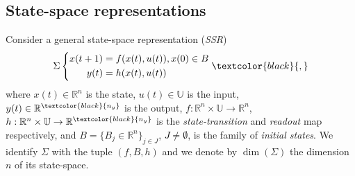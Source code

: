 \documentclass[journal,twoside,web]{ieeecolor}
\begin{document}
\subsection{State-space representations}
   Consider a general state-space representation (\emph{SSR})
\begin{equation}
\label{gen:eq1}
\Sigma \left \{\begin{split}
 x(t+1)&=f(x(t),u(t)), x(0) \in B \\
 y(t)& =h(x(t),u(t))
\end{split}\right. \textcolor{black}{,}
\end{equation}
where $x(t) \in \mathbb{R}^n$ is the state, $u(t) \in \mathbb{U}$ is the input, $y(t) \in \mathbb{R}^{\textcolor{black}{n_y}}$ is the output,
$f:\mathbb{R}^n \times \mathbb{U} \rightarrow \mathbb{R}^n$, 
$h:\mathbb{R}^n  \times \mathbb{U} \rightarrow \mathbb{R}^{\textcolor{black}{n_y}}$ is the \emph{state-transition} and
\emph{readout} map respectively, and  
   $B=\{B_j \in \mathbb{R}^n \}_{j \in J}$, \textcolor{black}{$J \ne \emptyset$}, is the family of \emph{initial states}. 
We identify  $\Sigma$ with the tuple $(f,B,h)$ and we denote by  $\dim(\Sigma)$ the dimension $n$ of its state-space.
%   
\end{document}
